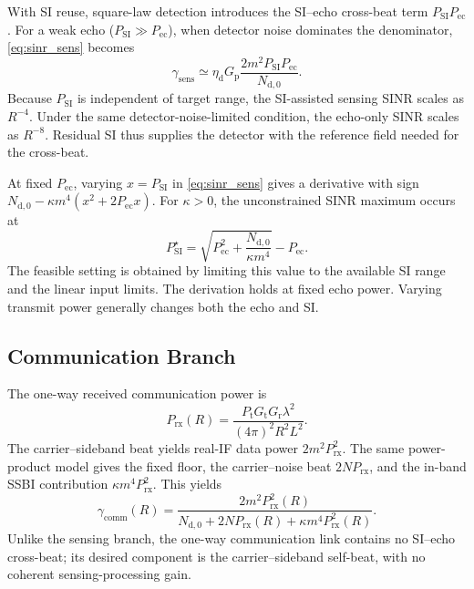 \documentclass[10pt,journal]{IEEEtran}
\DeclareRobustCommand{\rev}[1]{\textcolor{revisioncolor}{#1}}
\begin{document}
With SI reuse, square-law detection introduces the SI--echo cross-beat
term $P_{\mathrm{SI}}P_{\mathrm{ec}}$. For a weak echo
($P_{\mathrm{SI}}\gg P_{\mathrm{ec}}$), when detector noise dominates
the denominator, \eqref{eq:sinr_sens} becomes
\begin{equation}
\gamma_{\mathrm{sens}}
\simeq
\eta_{\mathrm d}G_{\mathrm p}
\frac{
2m^2P_{\mathrm{SI}}P_{\mathrm{ec}}
}{
N_{\mathrm{d},0}
}.
\label{eq:sinr_weak}
\end{equation}
Because $P_{\mathrm{SI}}$ is independent of target range, the
SI-assisted sensing SINR scales as $R^{-4}$. Under the same
detector-noise-limited condition, the echo-only SINR scales as
$R^{-8}$. \rev{Residual SI thus supplies the detector with the reference field
needed for the cross-beat.}

\rev{At fixed \(P_{\mathrm{ec}}\), varying \(x=P_{\mathrm{SI}}\) in
\eqref{eq:sinr_sens} gives a derivative with sign
\(N_{\mathrm{d},0}-\kappa m^4(x^2+2P_{\mathrm{ec}}x)\). For
\(\kappa>0\), the unconstrained SINR maximum occurs at}
{\color{revisioncolor}
\begin{equation}
P_{\mathrm{SI}}^\star=
\sqrt{P_{\mathrm{ec}}^2+\frac{N_{\mathrm{d},0}}{\kappa m^4}}
-P_{\mathrm{ec}}.
\label{eq:optimal_si}
\end{equation}}
\rev{The feasible setting is obtained by limiting this value to the
available SI range and the linear input limits. The derivation
holds at fixed echo power. Varying transmit power generally
changes both the echo and SI.}

\subsection{Communication Branch}
\label{sec:comm_branch}

The one-way received communication power is
\begin{equation}
P_{\mathrm{rx}}(R)=
\frac{P_{\mathrm t}G_{\mathrm t}G_{\mathrm r}\lambda^2}
{(4\pi)^2R^2L^2}.
\label{eq:prx}
\end{equation}
\rev{The carrier--sideband beat yields real-IF data power
\(2m^2P_{\mathrm{rx}}^2\). The same power-product model gives the
fixed floor, the carrier--noise beat \(2NP_{\mathrm{rx}}\), and the
in-band SSBI contribution \(\kappa m^4P_{\mathrm{rx}}^2\).
This yields}
\begin{equation}
\gamma_{\mathrm{comm}}(R)=
\frac{2m^2P_{\mathrm{rx}}^2(R)}
{N_{\mathrm{d},0}+2NP_{\mathrm{rx}}(R)
+\kappa m^4P_{\mathrm{rx}}^2(R)}.
\label{eq:sinr_comm}
\end{equation}
Unlike the sensing branch, the one-way communication link contains no
SI--echo cross-beat; its desired component is the carrier--sideband
self-beat, with no coherent sensing-processing gain.
\end{document}
